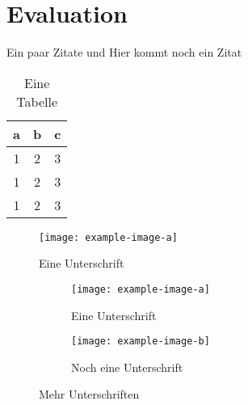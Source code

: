 \chapter{Evaluation}
\label{ch:Evaluation}

\blindtext




Ein paar Zitate \cite{Hartley2004} und \cite{Bishop2006} Hier kommt noch ein Zitat 
\cite{DorrChristopherH.2015SSBo}

\begin{table}[ht]
	\centering
	\begin{tabular}{c|c|c}
		a & b & c \\ \hline
		1 & 2 & 3 \\
		1 & 2 & 3 \\
		1 & 2 & 3
	\end{tabular}
	\caption{Eine Tabelle}
\end{table}

\begin{figure}[ht]
	\centering
	\texttt{[image: example-image-a]}
	\caption{Eine Unterschrift}
\end{figure}

\begin{figure}[ht]
	\centering
	\begin{subfigure}[b]{0.45\textwidth}
		\texttt{[image: example-image-a]}
		\caption{Eine Unterschrift}
	\end{subfigure} \hfill
	\begin{subfigure}[b]{0.45\textwidth}
		\texttt{[image: example-image-b]}
		\caption{Noch eine Unterschrift}
	\end{subfigure}
	\caption{Mehr Unterschriften}
\end{figure}



